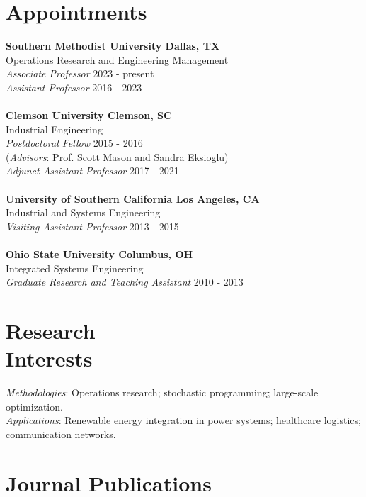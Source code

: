 \documentclass[hyperref, margin]{myResume}
\begin{document}
\begin{resume}
\section{Appointments}
\textbf{Southern Methodist University \hfill Dallas, TX} \\
Operations Research and Engineering Management\\
\textit{Associate Professor} \hfill 2023 - present\\
\textit{Assistant Professor} \hfill 2016 - 2023\\
\\
\textbf{Clemson University \hfill Clemson, SC} \\
Industrial Engineering \\
\textit{Postdoctoral Fellow} \hfill 2015 - 2016 \\
(\emph{Advisors}: Prof. Scott Mason and Sandra Eksioglu) \\
\textit{Adjunct Assistant Professor} \hfill 2017 - 2021 \\
\\
\textbf{University of Southern California \hfill Los Angeles, CA} \\
Industrial and Systems Engineering \\
\textit{Visiting Assistant Professor} \hfill 2013 - 2015 \\
\\
\textbf{Ohio State University \hfill Columbus, OH} \\
Integrated Systems Engineering \\
\textit{Graduate Research and Teaching Assistant} \hfill 2010 - 2013 \\

\section{Research \\Interests}
	\textit{Methodologies}: Operations research; stochastic programming; large-scale optimization. \\
	\textit{Applications}: Renewable energy integration in power systems; healthcare logistics; communication networks.


\section{Journal Publications}


\end{resume}
\end{document}
